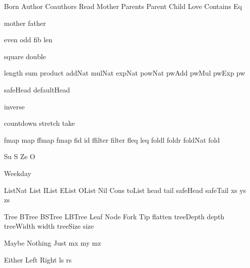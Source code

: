 
\DefRel Born
\DefRel Author
\DefRel Coauthors
\DefRel Read
\DefRel Mother
\DefRel Parents
\DefRel Parent
\DefRel Child
\DefRel Love
\DefRel Contains
\DefRel Eq

\DefFun mother
\DefFun father

\DefFun even
\DefFun odd
\DefFun fib
\DefFun len

\DefFpf square
\DefFpf double

\DefFpf length
\DefFpf sum
\DefFpf product
\DefFpf addNat
\DefFpf mulNat
\DefFpf expNat
\DefFpf powNat
\DefFpf pwAdd
\DefFpf pwMul
\DefFpf pwExp
\DefFpf pw

\DefFpf safeHead
\DefFpf defaultHead

\DefFpf inverse

\DefFpf countdown
\DefFpf stretch
\DefFpf take

\DefFPF fmap    map
\DefFPF ffmap   fmap
\DefFPF fid     id
\DefFPF ffilter filter
\DefFPF fleq    leq
\DefFpf foldl
\DefFpf foldr
\DefFpf foldNat
\DefFpf fold

\DefCONS Su S
\DefCONS Ze O

\DefType Weekday

\DefType ListNat
\DefType List
\DefType IList
\DefType EList
\DefType OList
\DefCons Nil
\DefCons Cons
\DefFpf  toList
\DefFpf  head
\DefFpf  tail
\DefFpf  safeHead
\DefFpf  safeTail
\DefVar  xs
\DefVar  ys
\DefVar  zs

\DefType Tree
\DefType BTree
\DefType BSTree
\DefType LBTree
\DefCons Leaf
\DefCons Node
\DefCons Fork
\DefCons Tip
\DefFpf  flatten
\DefFPF  treeDepth  depth
\DefFPF  treeWidth  width
\DefFPF  treeSize   size

\DefType Maybe
\DefCons Nothing
\DefCons Just
\DefVar  mx
\DefVar  my
\DefVar  mz

\DefType Either
\DefCons Left
\DefCons Right
\DefVar  ls
\DefVar  rs

\def\bla{\mathrm{bla}}
\def\blu{\mathrm{blu}}

\def\persons{{\cal P}}
\let\pers=\persons

\def\euclid{\algorithmstylize{Euclid}}%

\def\Smile{\rel{\woohoo}}
\def\Frown{\rel{\boohoo}}

\def\oddAs#1{A_{[#1]}}

